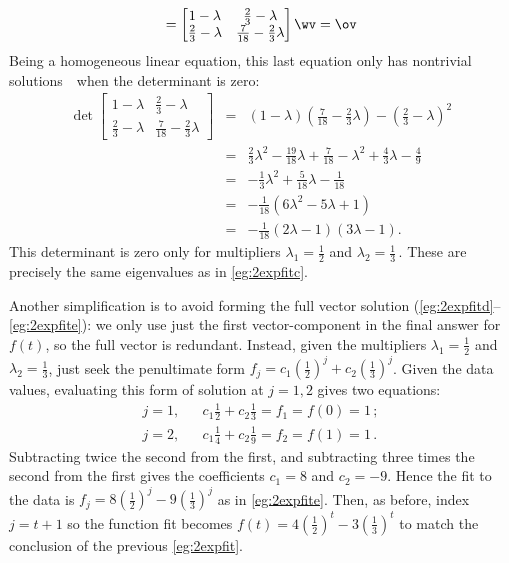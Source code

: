\begin{example}
\begin{solution}
\begin{equation*}
=\begin{bmatrix} 1-\lambda&\frac23-\lambda\\\frac23-\lambda&\frac7{18}-\frac23\lambda \end{bmatrix}\wv
=\ov
\end{equation*}
Being a homogeneous linear equation, this last equation only has nontrivial solutions~\wv\ when the determinant is zero:
\begin{eqnarray*}
\det\begin{bmatrix} 1-\lambda&\tfrac23-\lambda\\\tfrac23-\lambda&\frac7{18}-\tfrac23\lambda\end{bmatrix}
&=&(1-\lambda)(\tfrac7{18}-\tfrac23\lambda)-(\tfrac23-\lambda)^2
\\&=&\tfrac23\lambda^2-\tfrac{19}{18}\lambda+\tfrac7{18}
-\lambda^2+\tfrac43\lambda-\tfrac49
\\&=&-\tfrac13\lambda^2+\tfrac5{18}\lambda-\tfrac1{18}
\\&=&-\tfrac1{18}(6\lambda^2-5\lambda+1)
\\&=&-\tfrac1{18}(2\lambda-1)(3\lambda-1).
\end{eqnarray*}
This determinant is zero only for multipliers \(\lambda_1=\tfrac12\) and \(\lambda_2=\tfrac13\)\,. 
These are precisely the same eigenvalues as in \autoref{eg:2expfitc}.

Another simplification is to avoid forming the full vector solution (\autoref{eg:2expfitd}--\ref{eg:2expfite}):
we only use just the first vector-component in the final answer for~\(f(t)\), so the full vector is redundant.
Instead, given the multipliers \(\lambda_1=\tfrac12\) and \(\lambda_2=\tfrac13\), just seek the penultimate form \(f_j=c_1(\tfrac12)^j+c_2(\tfrac13)^j\).
Given the data values, evaluating this form of solution at \(j=1,2\) gives two equations:
\begin{eqnarray*}
j=1,&&c_1\tfrac12+c_2\tfrac13=f_1=f(0)=1\,;
\\
j=2,&&c_1\tfrac14+c_2\tfrac19=f_2=f(1)=1\,.
\end{eqnarray*}
Subtracting twice the second from the first, and subtracting three times the second from the first gives the coefficients \(c_1=8\) and \(c_2=-9\).
Hence the fit to the data is \(f_j=8(\frac12)^j -9(\frac13)^j\) as in \autoref{eg:2expfite}.
Then, as before, index \(j=t+1\) so the function fit becomes \(f(t)=4(\frac12)^{t} -3(\frac13)^{t}\) to match the conclusion of the previous \autoref{eg:2expfit}.
\end{solution}
\end{example}




